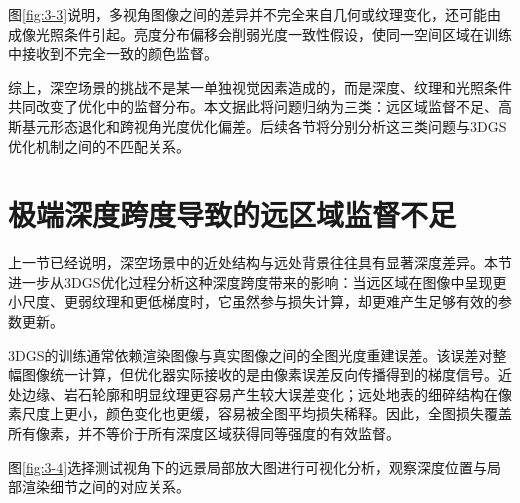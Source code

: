 图\ref{fig:3-3}说明，多视角图像之间的差异并不完全来自几何或纹理变化，还可能由成像光照条件引起。亮度分布偏移会削弱光度一致性假设，使同一空间区域在训练中接收到不完全一致的颜色监督。

综上，深空场景的挑战不是某一单独视觉因素造成的，而是深度、纹理和光照条件共同改变了优化中的监督分布。本文据此将问题归纳为三类：远区域监督不足、高斯基元形态退化和跨视角光度优化偏差。后续各节将分别分析这三类问题与3DGS优化机制之间的不匹配关系。


\section{极端深度跨度导致的远区域监督不足}

上一节已经说明，深空场景中的近处结构与远处背景往往具有显著深度差异。本节进一步从3DGS优化过程分析这种深度跨度带来的影响：当远区域在图像中呈现更小尺度、更弱纹理和更低梯度时，它虽然参与损失计算，却更难产生足够有效的参数更新。

3DGS的训练通常依赖渲染图像与真实图像之间的全图光度重建误差。该误差对整幅图像统一计算，但优化器实际接收的是由像素误差反向传播得到的梯度信号。近处边缘、岩石轮廓和明显纹理更容易产生较大误差变化；远处地表的细碎结构在像素尺度上更小，颜色变化也更缓，容易被全图平均损失稀释。因此，全图损失覆盖所有像素，并不等价于所有深度区域获得同等强度的有效监督。

图\ref{fig:3-4}选择测试视角下的远景局部放大图进行可视化分析，观察深度位置与局部渲染细节之间的对应关系。

